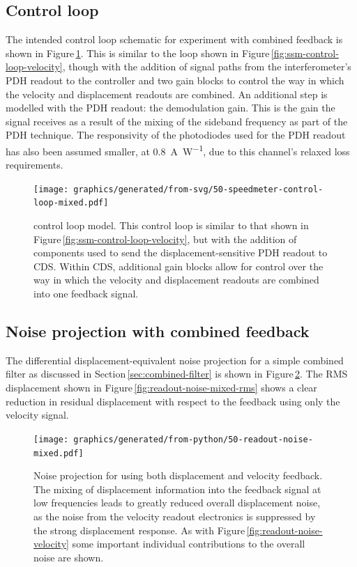 \subsection{Control loop}
The intended control loop schematic for experiment with combined feedback is shown in Figure\,\ref{fig:ssm-control-loop-mixed}. This is similar to the loop shown in Figure\,\ref{fig:ssm-control-loop-velocity}, though with the addition of signal paths from the interferometer's \gls{PDH} readout to the controller and two gain blocks to control the way in which the velocity and displacement readouts are combined. An additional step is modelled with the \gls{PDH} readout: the demodulation gain. This is the gain the signal receives as a result of the mixing of the sideband frequency as part of the \gls{PDH} technique. The responsivity of the photodiodes used for the \gls{PDH} readout has also been assumed smaller, at \SI{0.8}{\ampere\per\watt}, due to this channel's relaxed loss requirements.

\begin{figure}
  \texttt{[image: graphics/generated/from-svg/50-speedmeter-control-loop-mixed.pdf]}
  \caption[Modelled \SSMEXPT{} control loop using both displacement and velocity feedback]{\label{fig:ssm-control-loop-mixed}\SSM{} control loop model. This control loop is similar to that shown in Figure\,\ref{fig:ssm-control-loop-velocity}, but with the addition of components used to send the displacement-sensitive PDH readout to CDS. Within CDS, additional gain blocks allow for control over the way in which the velocity and displacement readouts are combined into one feedback signal.}
\end{figure}

\subsection{Noise projection with combined feedback}
The differential displacement-equivalent noise projection for a simple combined filter as discussed in Section\,\ref{sec:combined-filter} is shown in Figure\,\ref{fig:readout-noise-mixed}. The \gls{RMS} displacement shown in Figure\,\ref{fig:readout-noise-mixed-rms} shows a clear reduction in residual displacement with respect to the feedback using only the velocity signal.

\begin{figure}
  \centering
  \texttt{[image: graphics/generated/from-python/50-readout-noise-mixed.pdf]}
  \caption[Noise projection for \LMINUS{} using both displacement and velocity feedback]{\label{fig:readout-noise-mixed}Noise projection for \LMINUS{} using both displacement and velocity feedback. The mixing of displacement information into the feedback signal at low frequencies leads to greatly reduced overall displacement noise, as the noise from the velocity readout electronics is suppressed by the strong displacement response. As with Figure\,\ref{fig:readout-noise-velocity} some important individual contributions to the overall noise are shown.}
\end{figure}

